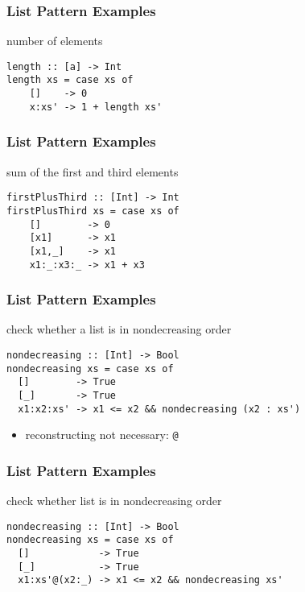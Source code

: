 \documentclass[dvipsnames]{beamer}
\theoremstyle{plain}
\begin{document}
\begin{frame}[fragile]
  \frametitle{List Pattern Examples}

  \begin{exampleblock}{number of elements}
    \begin{lstlisting}[deletekeywords={length}]
length :: [a] -> Int
length xs = case xs of
    []    -> 0
    x:xs' -> 1 + length xs'
    \end{lstlisting}
  \end{exampleblock}
\end{frame}

\begin{frame}[fragile]
  \frametitle{List Pattern Examples}

  \begin{exampleblock}{sum of the first and third elements}
    \begin{lstlisting}
firstPlusThird :: [Int] -> Int
firstPlusThird xs = case xs of
    []        -> 0
    [x1]      -> x1
    [x1,_]    -> x1
    x1:_:x3:_ -> x1 + x3
    \end{lstlisting}
  \end{exampleblock}
\end{frame}

\begin{frame}[fragile]
  \frametitle{List Pattern Examples}

  \begin{exampleblock}{check whether a list is in nondecreasing order}
    \begin{lstlisting}
nondecreasing :: [Int] -> Bool
nondecreasing xs = case xs of
  []        -> True
  [_]       -> True
  x1:x2:xs' -> x1 <= x2 && nondecreasing (x2 : xs')
    \end{lstlisting}
  \end{exampleblock}

  \begin{itemize}
    \item reconstructing not necessary: \lstinline|@|
  \end{itemize}
\end{frame}

\begin{frame}[fragile]
  \frametitle{List Pattern Examples}

  \begin{exampleblock}{check whether list is in nondecreasing order}
    \begin{lstlisting}
nondecreasing :: [Int] -> Bool
nondecreasing xs = case xs of
  []            -> True
  [_]           -> True
  x1:xs'@(x2:_) -> x1 <= x2 && nondecreasing xs'
    \end{lstlisting}
  \end{exampleblock}
\end{frame}
\end{document}
